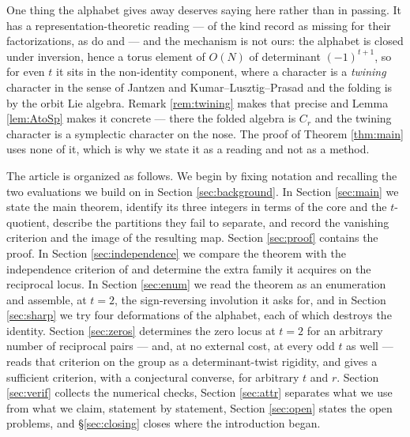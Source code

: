\documentclass[11pt,reqno]{amsart}
\theoremstyle{plain}
\theoremstyle{definition}
\begin{document}
One thing the alphabet gives away deserves saying here rather than in passing. It has a
representation-theoretic reading --- of the kind \cite{CK09} record as missing for their
factorizations, as do \cite{AB19} and \cite{AK25} --- and the mechanism is not ours: the alphabet is closed under
inversion, hence a torus element of $O(N)$ of determinant $(-1)^{t+1}$, so for even $t$ it sits in
the non-identity component, where a character is a \emph{twining} character in the sense of Jantzen
\cite{Jantzen} and Kumar--Lusztig--Prasad \cite{KLP} and the folding is by the orbit Lie algebra.
Remark \ref{rem:twining} makes that precise and Lemma \ref{lem:AtoSp} makes it concrete --- there the
folded algebra is $C_r$ and the twining character is a symplectic character on the nose. The proof of
Theorem \ref{thm:main} uses none of it, which is why we state it as a reading and not as a method.

The article is organized as follows. We begin by fixing notation and recalling the two evaluations we
build on in Section \ref{sec:background}. In Section \ref{sec:main} we state the main theorem,
identify its three integers in terms of the core and the $t$-quotient, describe the partitions they
fail to separate, and record the vanishing criterion and the image of the resulting map. Section \ref{sec:proof} contains the proof. In Section
\ref{sec:independence} we compare the theorem with the independence criterion of \cite{AK25} and
determine the extra family it acquires on the reciprocal locus. In Section \ref{sec:enum} we read the
theorem as an enumeration and assemble, at $t=2$, the sign-reversing involution it asks for,
and in Section \ref{sec:sharp} we try four deformations of the alphabet, each of which destroys the
identity.
Section \ref{sec:zeros} determines the zero locus at $t=2$ for an arbitrary number of reciprocal
pairs --- and, at no external cost, at every odd $t$ as well --- reads that criterion on the group as
a determinant-twist rigidity, and gives a sufficient criterion, with a conjectural converse, for
arbitrary $t$ and $r$.
Section \ref{sec:verif} collects the numerical checks, Section \ref{sec:attr} separates what we use
from what we claim, statement by statement, Section \ref{sec:open} states the open problems, and \S\ref{sec:closing} closes where the
introduction began.
\end{document}

